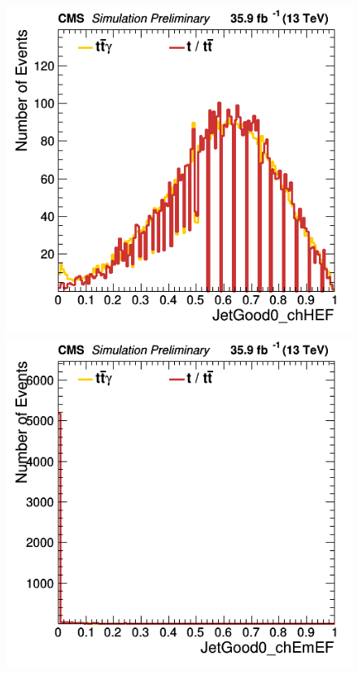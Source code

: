 \documentclass[11pt]{scrartcl}
\begin{document}
	\begin{figure}[H]
	\centering
	\begin{minipage}{.5\textwidth}
	  \centering
	  \includegraphics[width=0.7\linewidth]{figures/Notused/JetGood0_chHEF.png}
	\end{minipage}%
	\begin{minipage}{.5\textwidth}
	  \centering
	  \includegraphics[width=0.7\linewidth]{figures/Notused/JetGood0_chEmEF.png}
	\end{minipage}
	\end{figure}
	
\end{document}
